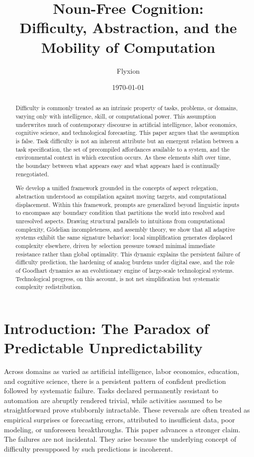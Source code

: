 \documentclass[12pt]{article}
\title{\textbf{Noun-Free Cognition:\\
Difficulty, Abstraction, and the Mobility of Computation}}
\author{Flyxion}
\date{\today}
\begin{document}
\maketitle

\begin{abstract}
Difficulty is commonly treated as an intrinsic property of tasks, problems, or domains, varying only with intelligence, skill, or computational power. This assumption underwrites much of contemporary discourse in artificial intelligence, labor economics, cognitive science, and technological forecasting. This paper argues that the assumption is false. Task difficulty is not an inherent attribute but an emergent relation between a task specification, the set of precompiled affordances available to a system, and the environmental context in which execution occurs. As these elements shift over time, the boundary between what appears easy and what appears hard is continually renegotiated.

We develop a unified framework grounded in the concepts of aspect relegation, abstraction understood as compilation against moving targets, and computational displacement. Within this framework, prompts are generalized beyond linguistic inputs to encompass any boundary condition that partitions the world into resolved and unresolved aspects. Drawing structural parallels to intuitions from computational complexity, Gödelian incompleteness, and assembly theory, we show that all adaptive systems exhibit the same signature behavior: local simplification generates displaced complexity elsewhere, driven by selection pressure toward minimal immediate resistance rather than global optimality. This dynamic explains the persistent failure of difficulty prediction, the hardening of analog burdens under digital ease, and the role of Goodhart dynamics as an evolutionary engine of large-scale technological systems. Technological progress, on this account, is not net simplification but systematic complexity redistribution.
\end{abstract}

\newpage

\section{Introduction: The Paradox of Predictable Unpredictability}

Across domains as varied as artificial intelligence, labor economics, education, and cognitive science, there is a persistent pattern of confident prediction followed by systematic failure. Tasks declared permanently resistant to automation are abruptly rendered trivial, while activities assumed to be straightforward prove stubbornly intractable. These reversals are often treated as empirical surprises or forecasting errors, attributed to insufficient data, poor modeling, or unforeseen breakthroughs. This paper advances a stronger claim. The failures are not incidental. They arise because the underlying concept of difficulty presupposed by such predictions is incoherent.
\end{document}
